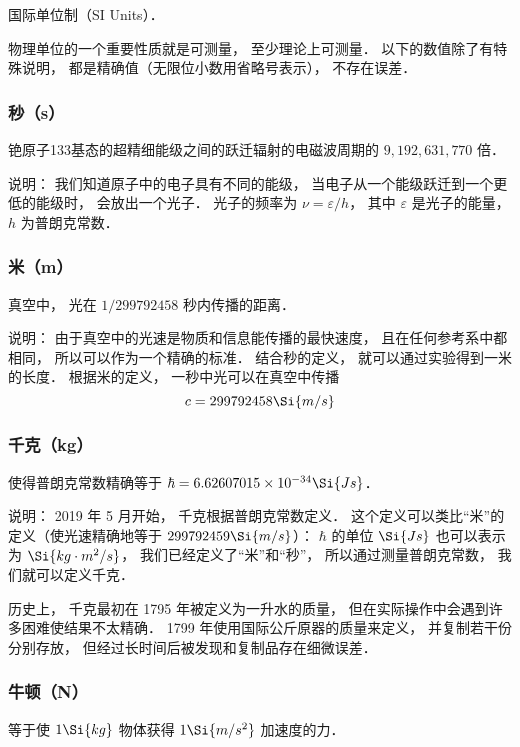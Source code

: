 
国际单位制（SI Units）．

物理单位的一个重要性质就是可测量， 至少理论上可测量． 以下的数值除了有特殊说明， 都是精确值（无限位小数用省略号表示）， 不存在误差．

\subsubsection{秒（s）}
铯原子133基态的超精细能级之间的跃迁辐射的电磁波周期的 $9, 192, 631, 770$ 倍． 

说明： 我们知道原子中的电子具有不同的能级， 当电子从一个能级跃迁到一个更低的能级时， 会放出一个光子． 光子的频率为 $\nu  = \varepsilon /h$，   其中 $\varepsilon $ 是光子的能量， $h$ 为普朗克常数．

\subsubsection{米（m）}
真空中， 光在 $1/299792458$ 秒内传播的距离．

说明： 由于真空中的光速是物质和信息能传播的最快速度， 且在任何参考系中都相同， 所以可以作为一个精确的标准． 结合秒的定义， 就可以通过实验得到一米的长度． 根据米的定义， 一秒中光可以在真空中传播
\begin{equation}
c = 299792458 \Si{m/s}
\end{equation}

\subsubsection{千克（kg）}
使得普朗克常数精确等于 $\hbar = 6.62607015\times10^{-34}\Si{Js}$．

说明： 2019 年 5 月开始， 千克根据普朗克常数定义． 这个定义可以类比“米”的定义（使光速精确地等于 $299792459\Si{m/s}$）： $\hbar$ 的单位 $\Si{Js}$ 也可以表示为 $\Si{kg\cdot m^2/s}$， 我们已经定义了“米”和“秒”， 所以通过测量普朗克常数， 我们就可以定义千克．

历史上， 千克最初在 1795 年被定义为一升水的质量， 但在实际操作中会遇到许多困难使结果不太精确． 1799 年使用国际公斤原器的质量来定义， 并复制若干份分别存放， 但经过长时间后被发现和复制品存在细微误差．

\subsubsection{牛顿（N）}
等于使 $1\Si{kg}$ 物体获得 $1\Si{m/s^2}$ 加速度的力．

